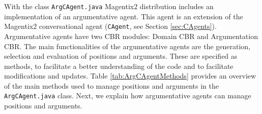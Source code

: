 With the class \lstinline{ArgCAgent.java} Magentix2 distribution includes an implementation of an argumentative agent. This agent is an extension of the Magentix2 conversational agent (\texttt{CAgent}, see Section \ref{sec:CAgents}). Argumentative agents have two CBR modules: Domain CBR and Argumentation CBR. %
The main functionalities of the argumentative agents are the generation, selection and evaluation of positions and arguments. These are specified as methods, to facilitate a better understanding of the code and to facilitate modifications and updates. Table \ref{tab:ArgCAgentMethods} provides an overview of the main methods used to manage positions and arguments in the \lstinline{ArgCAgent.java} class. Next, we explain how argumentative agents can manage positions and arguments.

